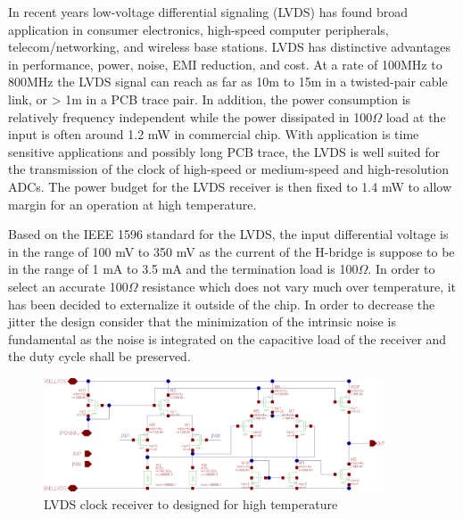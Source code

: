 In recent years low-voltage differential signaling (LVDS) has found broad application in consumer electronics, high-speed computer peripherals, telecom/networking, and wireless base stations. LVDS has distinctive advantages in performance, power, noise, EMI reduction, and cost. At a rate of 100MHz to 800MHz the LVDS signal can reach as far as 10m to 15m in a twisted-pair cable link, or > 1m in a PCB trace pair. In addition, the power consumption is relatively frequency independent while the power dissipated in 100$\Omega$ load at the input is often around 1.2 mW in commercial chip. With application is time sensitive applications and possibly long PCB trace, the LVDS is well suited for the transmission of the clock of high-speed or medium-speed and high-resolution ADCs. The power budget for the LVDS receiver is then fixed to 1.4 mW to allow margin for an operation at high temperature.

Based on the IEEE 1596 standard for the LVDS, the input differential voltage is in the range of 100 mV to 350 mV as the current of the H-bridge is suppose to be in the range of 1 mA to 3.5 mA and the termination load is 100$\Omega$. In order to select an accurate 100$\Omega$ resistance which does not vary much over temperature, it has been decided to externalize it outside of the chip. In order to decrease the jitter the design consider that the minimization of the intrinsic noise is fundamental as the noise is integrated on the capacitive load of the receiver and the duty cycle shall be preserved. 

\begin{figure}[htp]
    \centering
    \includegraphics[width=0.9\textwidth]{Chapter5/Figs/adc_chip/clk-recovery.png}
    \caption{LVDS clock receiver to designed for high temperature}
    \label{fig:lvds-receiver}
\end{figure}


